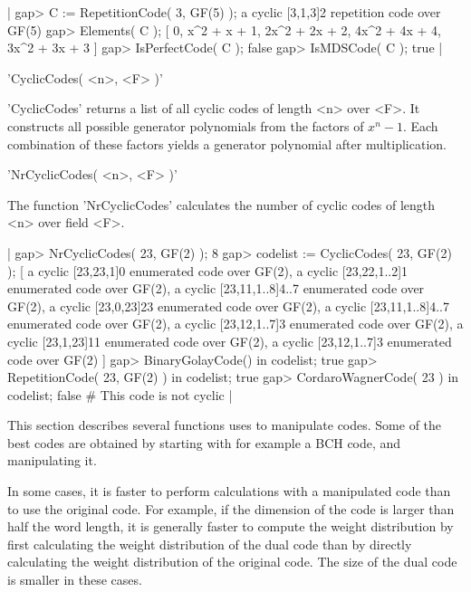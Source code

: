 |    gap> C := RepetitionCode( 3, GF(5) );
    a cyclic [3,1,3]2 repetition code over GF(5)
    gap> Elements( C );
    [ 0, x^2 + x + 1, 2x^2 + 2x + 2, 4x^2 + 4x + 4, 3x^2 + 3x + 3 ]
    gap> IsPerfectCode( C );
    false
    gap> IsMDSCode( C );
    true |


'CyclicCodes( <n>, <F> )'

'CyclicCodes' returns  a list  of all  cyclic  codes of  length  <n> over
<F>. It constructs all possible generator polynomials from the factors of
$x^n-1$. Each combination of these  factors yields a generator polynomial
after multiplication.

'NrCyclicCodes( <n>, <F> )'

The function  'NrCyclicCodes' calculates the  number  of cyclic  codes of
length <n> over field <F>.

|    gap> NrCyclicCodes( 23, GF(2) );
    8
    gap> codelist := CyclicCodes( 23, GF(2) );
    [ a cyclic [23,23,1]0 enumerated code over GF(2),
      a cyclic [23,22,1..2]1 enumerated code over GF(2),
      a cyclic [23,11,1..8]4..7 enumerated code over GF(2),
      a cyclic [23,0,23]23 enumerated code over GF(2),
      a cyclic [23,11,1..8]4..7 enumerated code over GF(2),
      a cyclic [23,12,1..7]3 enumerated code over GF(2),
      a cyclic [23,1,23]11 enumerated code over GF(2),
      a cyclic [23,12,1..7]3 enumerated code over GF(2) ]
    gap> BinaryGolayCode() in codelist;
    true
    gap> RepetitionCode( 23, GF(2) ) in codelist;
    true
    gap> CordaroWagnerCode( 23 ) in codelist;
    false    # This code is not cyclic |


This section describes several   functions  {\GUAVA} uses  to  manipulate
codes. Some of the best codes are obtained by starting with for example a
BCH code, and manipulating it.

In some  cases, it is  faster to perform  calculations with a manipulated
code than to use the original code. For  example, if the dimension of the
code  is larger than  half  the word length,  it  is generally  faster to
compute  the   weight  distribution  by  first   calculating   the weight
distribution of the  dual code than   by directly calculating  the weight
distribution of the original code.  The size of the  dual code is smaller
in these cases.

